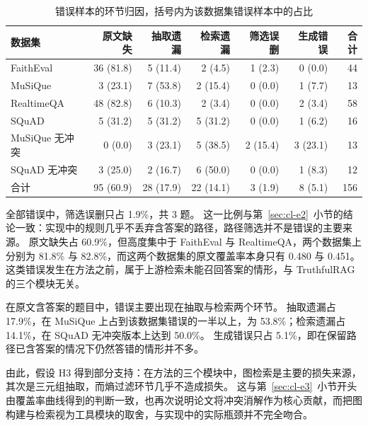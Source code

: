 \begin{table}[htbp]
  \centering
  \small
  \setlength{\tabcolsep}{5pt}
  \renewcommand{\arraystretch}{1.3}
  \caption{错误样本的环节归因，括号内为该数据集错误样本中的占比}
  \label{tab:cl-attr}
  \begin{tabular}{lrrrrrr}
    \toprule
    数据集 & 原文缺失 & 抽取遗漏 & 检索遗漏 & 筛选误删 & 生成错误 & 合计 \\
    \midrule
    FaithEval      & 36 (81.8) & 5 (11.4) & 2 (4.5)  & 1 (2.3)  & 0 (0.0)  & 44 \\
    MuSiQue        & 3 (23.1)  & 7 (53.8) & 2 (15.4) & 0 (0.0)  & 1 (7.7)  & 13 \\
    RealtimeQA     & 48 (82.8) & 6 (10.3) & 2 (3.4)  & 0 (0.0)  & 2 (3.4)  & 58 \\
    SQuAD          & 5 (31.2)  & 5 (31.2) & 5 (31.2) & 0 (0.0)  & 1 (6.2)  & 16 \\
    MuSiQue 无冲突 & 0 (0.0)   & 3 (23.1) & 5 (38.5) & 2 (15.4) & 3 (23.1) & 13 \\
    SQuAD 无冲突   & 3 (25.0)  & 2 (16.7) & 6 (50.0) & 0 (0.0)  & 1 (8.3)  & 12 \\
    \midrule
    合计           & 95 (60.9) & 28 (17.9) & 22 (14.1) & 3 (1.9) & 8 (5.1) & 156 \\
    \bottomrule
  \end{tabular}
\end{table}

全部错误中，筛选误删只占 1.9\%，共 3 题。
这一比例与第~\ref{sec:cl-e2}~小节的结论一致：实现中的规则几乎不丢弃含答案的路径，路径筛选并不是错误的主要来源。
原文缺失占 60.9\%，但高度集中于 FaithEval 与 RealtimeQA，两个数据集上分别为 81.8\% 与 82.8\%，而这两个数据集的原文覆盖率本身只有 0.480 与 0.451。
这类错误发生在方法之前，属于上游检索未能召回答案的情形，与 TruthfulRAG 的三个模块无关。

在原文含答案的题目中，错误主要出现在抽取与检索两个环节。
抽取遗漏占 17.9\%，在 MuSiQue 上占到该数据集错误的一半以上，为 53.8\%；检索遗漏占 14.1\%，在 SQuAD 无冲突版本上达到 50.0\%。
生成错误只占 5.1\%，即在保留路径已含答案的情况下仍然答错的情形并不多。

由此，假设 H3 得到部分支持：在方法的三个模块中，图检索是主要的损失来源，其次是三元组抽取，而熵过滤环节几乎不造成损失。
这与第~\ref{sec:cl-e3}~小节开头由覆盖率曲线得到的判断一致，也再次说明论文将冲突消解作为核心贡献，而把图构建与检索视为工具模块的取舍，与实现中的实际瓶颈并不完全吻合。
